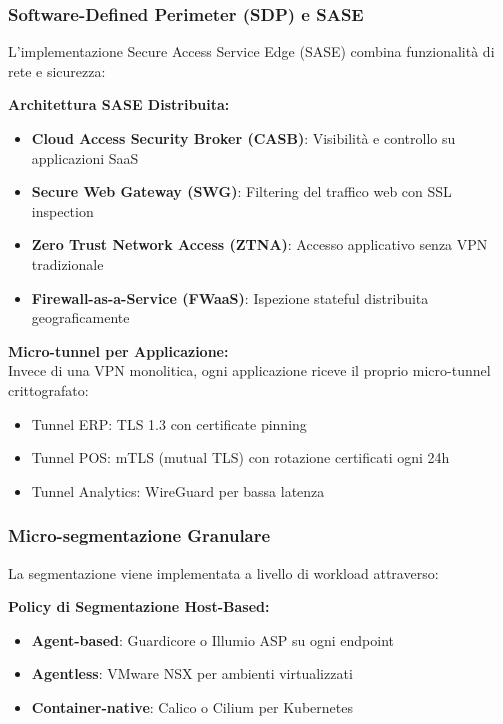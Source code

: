 \subsubsection{Software-Defined Perimeter (SDP) e SASE}

L'implementazione Secure Access Service Edge (SASE) combina funzionalità di rete e sicurezza:

\textbf{Architettura SASE Distribuita:}
\begin{itemize}
    \item \textbf{Cloud Access Security Broker (CASB)}: Visibilità e controllo su applicazioni SaaS
    \item \textbf{Secure Web Gateway (SWG)}: Filtering del traffico web con SSL inspection
    \item \textbf{Zero Trust Network Access (ZTNA)}: Accesso applicativo senza VPN tradizionale
    \item \textbf{Firewall-as-a-Service (FWaaS)}: Ispezione stateful distribuita geograficamente
\end{itemize}

\textbf{Micro-tunnel per Applicazione:}\\
Invece di una VPN monolitica, ogni applicazione riceve il proprio micro-tunnel crittografato:
\begin{itemize}
    \item Tunnel ERP: TLS 1.3 con certificate pinning
    \item Tunnel POS: mTLS (mutual TLS) con rotazione certificati ogni 24h
    \item Tunnel Analytics: WireGuard per bassa latenza
\end{itemize}

\subsubsection{Micro-segmentazione Granulare}

La segmentazione viene implementata a livello di workload attraverso:

\textbf{Policy di Segmentazione Host-Based:}
\begin{itemize}
    \item \textbf{Agent-based}: Guardicore o Illumio ASP su ogni endpoint
    \item \textbf{Agentless}: VMware NSX per ambienti virtualizzati
    \item \textbf{Container-native}: Calico o Cilium per Kubernetes
\end{itemize}


